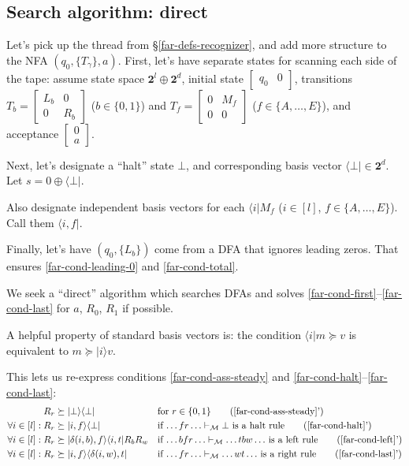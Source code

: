 \subsection{Search algorithm: direct}
\label{far-algo-direct}
Let's pick up the thread from \S\ref{far-defs-recognizer}, %
and add more structure to the NFA $(q_0, \{T_\gamma\}, a)$.
First, let's have separate states for scanning each side of the tape:
assume state space $\mathbf{2}^l \oplus \mathbf{2}^d$,
initial state $\begin{bmatrix}q_0&0\end{bmatrix}$,
transitions
 $T_b=\begin{bmatrix}L_b&0\\0&R_b\end{bmatrix}$ ($b\in\{0,1\}$) and
 $T_f=\begin{bmatrix}0&M_f\\0&0\end{bmatrix}$ ($f\in\{A,\ldots,E\}$),
and acceptance $\begin{bmatrix}0\\a\end{bmatrix}$.

Next, let's designate a ``halt'' state $\bot$, and corresponding basis vector $\langle\bot\vert\in\mathbf{2}^d$.
Let $s=0\oplus\langle\bot\vert$.

Also designate independent basis vectors for each $\langle i\vert M_f$ ($i\in[l]$, $f\in\{A,\ldots,E\}$).
Call them $\langle i,f\vert$.

Finally, let's have $(q_0,\{L_b\})$ come from a DFA that ignores leading zeros.
That ensures \eqref{far-cond-leading-0} and \eqref{far-cond-total}.

We seek a ``direct'' algorithm which searches DFAs and solves \eqref{far-cond-first}--\eqref{far-cond-last} for $a$, $R_0$, $R_1$ if possible.

A helpful property of standard basis vectors is: the condition $\langle i\vert m\succeq v$ is equivalent to $m\succeq\vert i\rangle v$.

This lets us re-express conditions \eqref{far-cond-ass-steady} and \eqref{far-cond-halt}--\eqref{far-cond-last}:
\begin{align}
  R_r &\succeq \vert\bot\rangle \langle\bot\vert
  &&\text{for }r\in\{0,1\}
  \tag{\ref{far-cond-ass-steady}'}
  \\
  \forall i\in[l]: R_r &\succeq \vert i,f\rangle \langle\bot\vert
  &&\text{if $\ldots fr\ldots\vdash_\mathcal{M}\bot$ is a halt rule}
  \tag{\ref{far-cond-halt}'}
  \\
  \forall i\in[l]: R_r &\succeq \vert\delta(i,b),f\rangle \langle i,t\vert R_b R_w
  &&\text{if $\ldots bfr\ldots\vdash_\mathcal{M}\ldots tbw\ldots$ is a left rule}
  \tag{\ref{far-cond-left}'}
  \\
  \forall i\in[l]: R_r &\succeq \vert i,f\rangle \langle \delta(i,w),t\vert
  &&\text{if $\ldots fr\ldots\vdash_\mathcal{M}\ldots wt\ldots$ is a right rule}
  \tag{\ref{far-cond-last}'}
\end{align}

